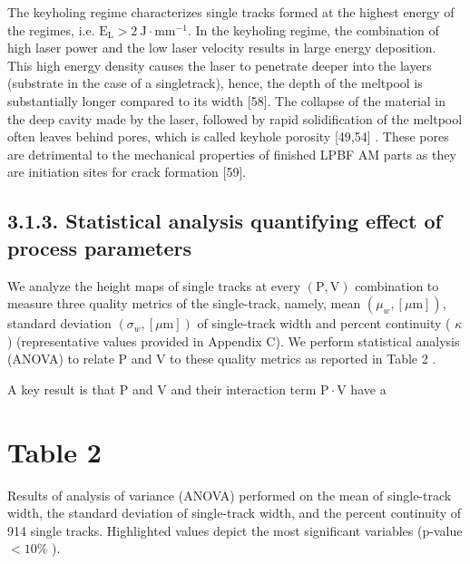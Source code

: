 \documentclass[10pt]{article}
\begin{document}
The keyholing regime characterizes single tracks formed at the highest energy of the regimes, i.e. $\mathrm{E}_{\mathrm{L}}>2 \mathrm{~J} \cdot \mathrm{mm}^{-1}$. In the keyholing regime, the combination of high laser power and the low laser velocity results in large energy deposition. This high energy density causes the laser to penetrate deeper into the layers (substrate in the case of a singletrack), hence, the depth of the meltpool is substantially longer compared to its width [58]. The collapse of the material in the deep cavity made by the laser, followed by rapid solidification of the meltpool often leaves behind pores, which is called keyhole porosity [49,54] . These pores are detrimental to the mechanical properties of finished LPBF AM parts as they are initiation sites for crack formation [59].

\subsection*{3.1.3. Statistical analysis quantifying effect of process parameters}
We analyze the height maps of single tracks at every $(\mathrm{P}, \mathrm{V})$ combination to measure three quality metrics of the single-track, namely, mean $\left(\mu_{w},[\mu \mathrm{m}]\right)$, standard deviation $\left(\sigma_{w},[\mu \mathrm{m}]\right)$ of single-track width and percent continuity ( $\kappa$ ) (representative values provided in Appendix C). We perform statistical analysis (ANOVA) to relate P and V to these quality metrics as reported in Table 2 .

A key result is that $\mathrm{P}$ and $\mathrm{V}$ and their interaction term $\mathrm{P} \cdot \mathrm{V}$ have a

\section*{Table 2}
Results of analysis of variance (ANOVA) performed on the mean of single-track width, the standard deviation of single-track width, and the percent continuity of 914 single tracks. Highlighted values depict the most significant variables (p-value $<10 \%$ ).
\end{document}
